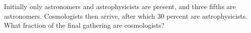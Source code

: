 Initially only astronomers and astrophysicists are present, and three fifths are astronomers. Cosmologists then arrive, after which 30 percent are astrophysicists. What fraction of the final gathering are cosmologists?
